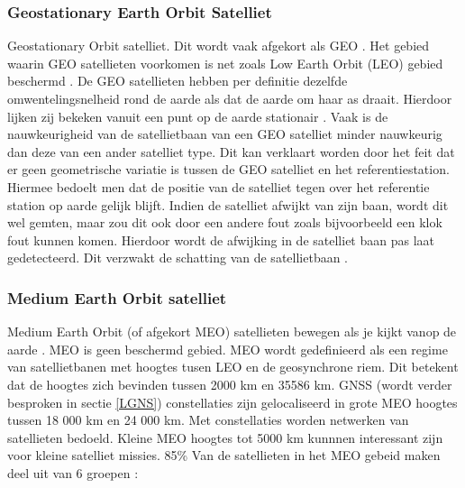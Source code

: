 \subsubsection{Geostationary Earth Orbit Satelliet}
Geostationary Orbit satelliet. Dit wordt vaak afgekort als GEO \cite{LBibGEO,LBibMEO}. Het gebied waarin GEO satellieten voorkomen is net zoals Low Earth Orbit (LEO) gebied beschermd \cite{LBibMEO}. De GEO satellieten hebben per definitie dezelfde omwentelingsnelheid rond de aarde als dat de aarde om haar as draait. Hierdoor lijken zij bekeken vanuit een punt op de aarde stationair \cite{LBibGEO}.  Vaak is de nauwkeurigheid van de satellietbaan van een GEO satelliet minder nauwkeurig dan deze van een ander satelliet type. Dit kan verklaart worden door het feit dat er geen geometrische variatie is tussen de GEO satelliet en het referentiestation. Hiermee bedoelt men dat de positie van de satelliet tegen over het referentie station op aarde gelijk blijft. Indien de satelliet afwijkt van zijn baan, wordt dit wel gemten, maar zou dit ook door een andere fout zoals bijvoorbeeld een klok fout kunnen komen. Hierdoor wordt de afwijking in de satelliet baan pas laat gedetecteerd. Dit verzwakt de schatting van de satellietbaan \cite{LBibPPP2}. 
 
\subsubsection{Medium Earth Orbit satelliet}
Medium Earth Orbit (of afgekort MEO) satellieten bewegen als je kijkt vanop de aarde \cite{LBibGEO}. MEO is geen beschermd gebied. MEO wordt gedefinieerd als een regime van satellietbanen met hoogtes tusen LEO en de geosynchrone riem. Dit betekent dat de hoogtes zich bevinden tussen 2000 km en 35586 km.  GNSS (wordt verder besproken in sectie \ref{LGNS}) constellaties zijn gelocaliseerd in grote MEO hoogtes tussen 18 000 km en 24 000 km. Met constellaties worden netwerken van satellieten bedoeld. Kleine MEO hoogtes tot 5000 km kunnnen interessant zijn voor kleine satelliet missies. 85\% Van de satellieten in het MEO gebeid maken deel uit van 6 groepen \cite{LBibMEO}:

